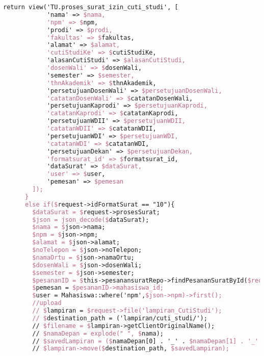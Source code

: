\begin{lstlisting}[language=tex,basicstyle=\tiny,caption=PesanansuratController.php]
        return view('TU.proses_surat_izin_cuti_studi', [
            'nama' => $nama,
            'npm' => $npm,
            'prodi' => $prodi,
            'fakultas' => $fakultas,
            'alamat' => $alamat,
            'cutiStudiKe' => $cutiStudiKe,
            'alasanCutiStudi' => $alasanCutiStudi,
            'dosenWali' => $dosenWali,
            'semester' => $semester,
            'thnAkademik' => $thnAkademik,
            'persetujuanDosenWali' => $persetujuanDosenWali,
            'catatanDosenWali' => $catatanDosenWali,
            'persetujuanKaprodi' => $persetujuanKaprodi,
            'catatanKaprodi' => $catatanKaprodi,
            'persetujuanWDII' => $persetujuanWDII,
            'catatanWDII' => $catatanWDII,
            'persetujuanWDI' => $persetujuanWDI,
            'catatanWDI' => $catatanWDI,
            'persetujuanDekan' => $persetujuanDekan,
            'formatsurat_id' => $formatsurat_id,
            'dataSurat' => $dataSurat,
            'user' => $user,
            'pemesan' => $pemesan
        ]);
      }
      else if($request->idFormatSurat == "10"){
        $dataSurat = $request->prosesSurat;
        $json = json_decode($dataSurat);
        $nama = $json->nama;
        $npm = $json->npm;
        $alamat = $json->alamat;
        $noTelepon = $json->noTelepon;
        $namaOrtu = $json->namaOrtu;
        $dosenWali = $json->dosenWali;
        $semester = $json->semester;
        $pesananID = $this->pesanansuratRepo->findPesananSuratById($request->id);
        $pemesan = $pesananID->mahasiswa_id;
        $user = Mahasiswa::where('npm',$json->npm)->first();
        //upload
        // $lampiran = $request->file('lampiran_CutiStudi');
        // $destination_path = ('lampiran/cuti_studi/');
        // $filename = $lampiran->getClientOriginalName();
        // $namaDepan = explode(" ", $nama);
        // $savedLampiran = ($namaDepan[0] . '_' . $namaDepan[1] . '_' .$filename);
        // $lampiran->move($destination_path, $savedLampiran);


\end{lstlisting}
